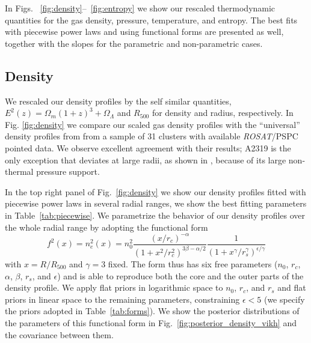 \documentclass[traditabstract   ]{aa} %
\begin{document}
In Figs. ~\ref{fig:density}--~\ref{fig:entropy} we show our rescaled thermodynamic quantities for the gas density, pressure, temperature, and entropy. The best fits with piecewise power laws and using functional forms are presented as well, together with the slopes for the parametric and non-parametric cases. 

\subsection{Density}
\label{sec:density}

We rescaled our density profiles by the self similar quantities, $E^2(z)=\Omega_m(1+z)^3+\Omega_\Lambda$ and $R_{500}$ for density and radius, respectively. In Fig. \ref{fig:density} we compare our scaled gas density profiles with the ``universal'' density profiles from \cite{eckert12} from a sample of 31 clusters with available \emph{ROSAT}/PSPC pointed data. We observe  excellent agreement with their results; A2319 is the only exception that deviates at large radii, as shown in \citet{ghirardini18}, because of its large non-thermal pressure support.

In the top right panel of Fig.~\ref{fig:density} we show our density profiles fitted with piecewise power laws in several radial ranges, { we show the best fitting parameters in Table~\ref{tab:piecewise}}. We parametrize the behavior of our density profiles over the whole radial range by adopting the \cite{vikhlini+06} functional form
\begin{equation}
f^2(x) = n_e^2(x)= n_0^2 \frac{(x/r_c)^{-\alpha}}{(1+x^2/r_c^2)^{3\beta-\alpha/2}} \frac{1}{(1+x^\gamma/r_s^\gamma)^{\epsilon/\gamma}}
\label{eq:vikh_density}
\end{equation}
with $x = R/R_{500}$ and $\gamma = 3$ fixed. The form thus has six free parameters ($n_0$, $r_c$, $\alpha$, $\beta$, $r_s$, and $\epsilon$) and is able to reproduce both the core and the outer parts of the density profile. We apply flat priors in logarithmic space to $n_0$, $r_c$, and $r_s$ and flat priors in linear space to the remaining parameters, constraining $\epsilon < 5$ (we specify the priors adopted in Table~\ref{tab:forms}). We show the posterior distributions of the parameters of this functional form in Fig.~\ref{fig:posterior_density_vikh} and the covariance between them.
\end{document}
